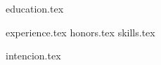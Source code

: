 \documentclass[11pt, a4paper]{awesome-cv}
\newcommand*{\sectiondir}{resume/}
\begin{document}
\makecvheader

{education.tex}

{experience.tex}
{honors.tex}
{skills.tex}


\clearpage
{intencion.tex}
\end{document}
